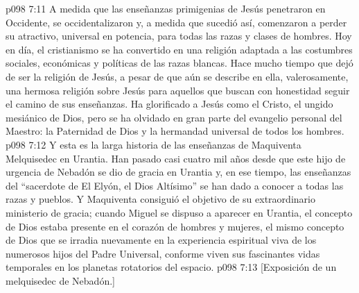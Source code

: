 \vs p098 7:11 \pc A medida que las enseñanzas primigenias de Jesús penetraron en Occidente, se occidentalizaron y, a medida que sucedió así, comenzaron a perder su atractivo, universal en potencia, para todas las razas y clases de hombres. Hoy en día, el cristianismo se ha convertido en una religión adaptada a las costumbres sociales, económicas y políticas de las razas blancas. Hace mucho tiempo que dejó de ser la religión de Jesús, a pesar de que aún se describe en ella, valerosamente, una hermosa religión sobre Jesús para aquellos que buscan con honestidad seguir el camino de sus enseñanzas. Ha glorificado a Jesús como el Cristo, el ungido mesiánico de Dios, pero se ha olvidado en gran parte del evangelio personal del Maestro: la Paternidad de Dios y la hermandad universal de todos los hombres.
\vs p098 7:12 \pc Y esta es la larga historia de las enseñanzas de Maquiventa Melquisedec en Urantia. Han pasado casi cuatro mil años desde que este hijo de urgencia de Nebadón se dio de gracia en Urantia y, en ese tiempo, las enseñanzas del “sacerdote de El Elyón, el Dios Altísimo” se han dado a conocer a todas las razas y pueblos. Y Maquiventa consiguió el objetivo de su extraordinario ministerio de gracia; cuando Miguel se dispuso a aparecer en Urantia, el concepto de Dios estaba presente en el corazón de hombres y mujeres, el mismo concepto de Dios que se irradia nuevamente en la experiencia espiritual viva de los numerosos hijos del Padre Universal, conforme viven sus fascinantes vidas temporales en los planetas rotatorios del espacio.
\vsetoff
\vs p098 7:13 [Exposición de un melquisedec de Nebadón.]
